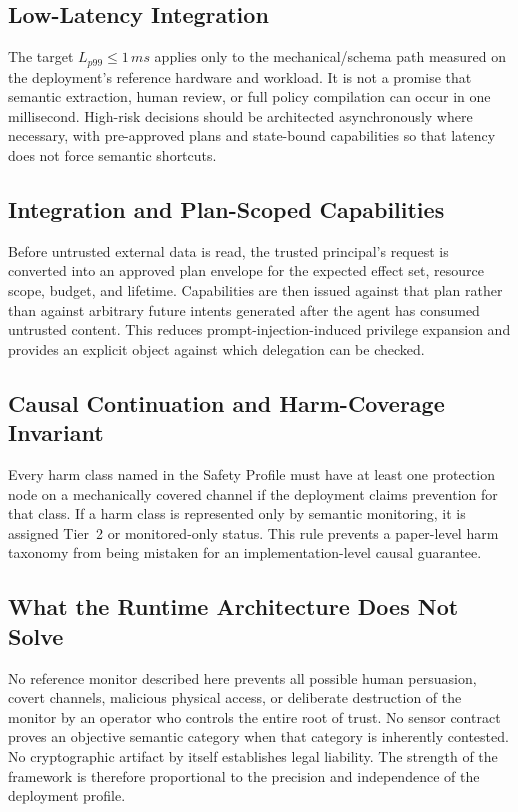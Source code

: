 \documentclass[11pt]{article}
\def\ensuremath#1{#1}%
\def\mathrm#1{#1}%
\newcommand{\latTarget}{\ensuremath{L_{p99}}}
\begin{document}
\subsection{Low-Latency Integration}
The target \(\latTarget\le 1\,\mathrm{ms}\) applies only to the mechanical/schema path measured on the deployment's reference hardware and workload. It is not a promise that semantic extraction, human review, or full policy compilation can occur in one millisecond. High-risk decisions should be architected asynchronously where necessary, with pre-approved plans and state-bound capabilities so that latency does not force semantic shortcuts.

\subsection{Integration and Plan-Scoped Capabilities}
Before untrusted external data is read, the trusted principal's request is converted into an approved plan envelope for the expected effect set, resource scope, budget, and lifetime. Capabilities are then issued against that plan rather than against arbitrary future intents generated after the agent has consumed untrusted content. This reduces prompt-injection-induced privilege expansion and provides an explicit object against which delegation can be checked.

\subsection{Causal Continuation and Harm-Coverage Invariant}
Every harm class named in the Safety Profile must have at least one protection node on a mechanically covered channel if the deployment claims prevention for that class. If a harm class is represented only by semantic monitoring, it is assigned Tier~2 or monitored-only status. This rule prevents a paper-level harm taxonomy from being mistaken for an implementation-level causal guarantee.

\subsection{What the Runtime Architecture Does Not Solve}
No reference monitor described here prevents all possible human persuasion, covert channels, malicious physical access, or deliberate destruction of the monitor by an operator who controls the entire root of trust. No sensor contract proves an objective semantic category when that category is inherently contested. No cryptographic artifact by itself establishes legal liability. The strength of the framework is therefore proportional to the precision and independence of the deployment profile.
\end{document}

